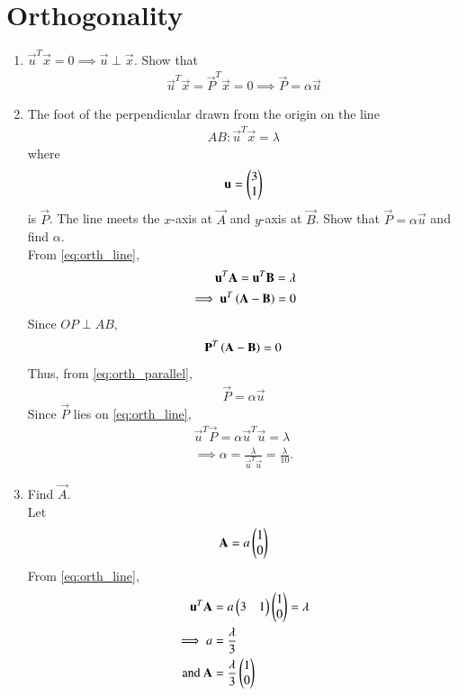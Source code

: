 \documentclass[journal,12pt,twocolumn]{IEEEtran}
\renewcommand\thesection{\arabic{section}}
\begin{document}
\section{Orthogonality}
\begin{enumerate}[label=\thesection.\arabic*
,ref=\thesection.\theenumi]
\item $\vec{u}^T\vec{x} = 0 \implies \vec{u} \perp \vec{x}$. Show that 
\begin{align}
\label{eq:orth_parallel}
\vec{u}^T\vec{x}  = \vec{P}^T\vec{x} = 0 \implies \vec{P} =\alpha 
\vec{u}
\end{align}
%
\item The foot of the perpendicular drawn from the origin on the line 
\begin{align}
\label{eq:orth_line}
AB: \vec{u}^T\vec{x}  =\lambda
\end{align}
where
\begin{align}
\mathbf{u}=\begin{pmatrix}3 \\ 1\end{pmatrix}
\end{align}
is $\vec{P}$.  The line meets the $x$-axis at $\vec{A}$ and $y$-axis at $\vec{B}$. Show that $\vec{P} =\alpha 
\vec{u}$ and find $\alpha$.
\\
\solution From \eqref{eq:orth_line},
\begin{align}
\mathbf{u}^T\mathbf{A}=\mathbf{u}^T\mathbf{B}=\lambda
\\
\implies \mathbf{u}^T\left(\mathbf{A}-\mathbf{B}\right)=0
\end{align}
%
Since $OP \perp AB$,
\begin{align}
\mathbf{P}^T\left(\mathbf{A}-\mathbf{B}\right)=0
\end{align}
%
Thus, from \eqref{eq:orth_parallel},
\begin{align}
\vec{P} =\alpha \vec{u}
\label{eq:orth_purel}
\end{align}
%
Since $\vec{P} $ lies on \eqref{eq:orth_line},
\begin{align}
\vec{u}^T\vec{P}=\alpha\vec{u}^T\vec{u}=\lambda
\\
\implies \alpha = \frac{\lambda}{\vec{u}^T\vec{u}} = \frac{\lambda}{10}.
\label{eq:orth_alpha}
\end{align}
%
\item Find $\vec{A} $.
\\
\solution Let
\begin{equation}
\mathbf{A} = a\begin{pmatrix}1 \\ 0\end{pmatrix}
\label{eq:orth_adef}
\end{equation}
From \eqref{eq:orth_line},
\begin{align}
\mathbf{u}^T\mathbf{A} &= a\begin{pmatrix}3 & 1\end{pmatrix}\begin{pmatrix}1 \\ 0\end{pmatrix} = \lambda
\\
\implies a &= \frac{\lambda}{3}
\label{eq:orth_a}
\\
\text{and } \mathbf{A} &= \frac{\lambda}{3}\begin{pmatrix}1 \\ 0\end{pmatrix}
\end{align}


\end{enumerate}
\end{document}
